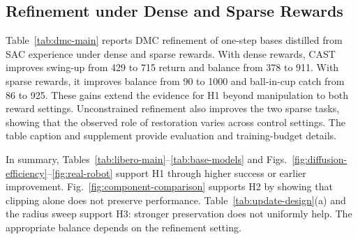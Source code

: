 \subsection{Refinement under Dense and Sparse Rewards}
\label{sec:exp-dmc}


Table~\ref{tab:dmc-main} reports DMC refinement of one-step bases
distilled from SAC experience under dense and sparse rewards. With dense
rewards, CAST improves swing-up from 429 to 715 return and balance from
378 to 911. With sparse rewards, it improves balance from 90 to 1000
and ball-in-cup catch from 86 to 925. These gains extend the evidence for
H1 beyond manipulation to both reward settings. Unconstrained refinement
also improves the two sparse tasks, showing that the observed role of
restoration varies across control settings. The table caption and
supplement provide evaluation and training-budget details.

In summary, Tables~\ref{tab:libero-main}--\ref{tab:base-models} and
Figs.~\ref{fig:diffusion-efficiency}--\ref{fig:real-robot} support H1
through higher success or earlier improvement. Fig.~\ref{fig:component-comparison}
supports H2 by showing that clipping alone does not preserve performance.
Table~\ref{tab:update-design}(a) and the radius sweep support H3: stronger
preservation does not uniformly help. The appropriate balance depends on
the refinement setting.
